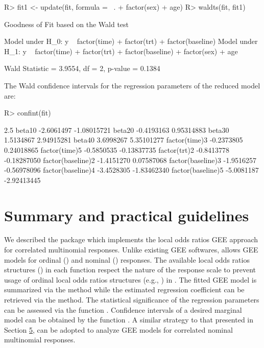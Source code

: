 \documentclass[
]{jss}
\begin{document}
\begin{CodeChunk}

\begin{CodeInput}
R> fit1 <- update(fit, formula = ~. + factor(sex) + age)
R> waldts(fit, fit1)
\end{CodeInput}

\begin{CodeOutput}
Goodness of Fit based on the Wald test 

Model under H_0: y ~ factor(time) + factor(trt) + factor(baseline)
Model under H_1: y ~ factor(time) + factor(trt) + factor(baseline) + factor(sex) + 
    age

Wald Statistic = 3.9554, df = 2, p-value = 0.1384
\end{CodeOutput}
\end{CodeChunk}

The Wald confidence intervals for the regression parameters of the
reduced model are:

\begin{CodeChunk}

\begin{CodeInput}
R> confint(fit)
\end{CodeInput}

\begin{CodeOutput}
                       2.5 %
beta10            -2.6061497 -1.08015721
beta20            -0.4193163  0.95314883
beta30             1.5134867  2.94915281
beta40             3.6998267  5.35101277
factor(time)3     -0.2373805  0.24018865
factor(time)5     -0.5850535 -0.13837735
factor(trt)2      -0.8413778 -0.18287050
factor(baseline)2 -1.4151270  0.07587068
factor(baseline)3 -1.9516257 -0.56978096
factor(baseline)4 -3.4528305 -1.83462340
factor(baseline)5 -5.0081187 -2.92413445
\end{CodeOutput}
\end{CodeChunk}

\hypertarget{Summary}{%
\section{Summary and practical guidelines}\label{Summary}}

We described the  package  which implements the
local odds ratios GEE approach \citep{Touloumis2012} for correlated
multinomial responses. Unlike existing GEE softwares, 
allows GEE models for ordinal () and nominal
() responses. The available local odds ratios structures
() in each function respect the nature of the response
scale to prevent usage of ordinal local odds ratios structures (e.g.,
) in . The fitted GEE model is
summarized via the  method while the estimated regression
coefficient can be retrieved via the  method. The statistical
significance of the regression parameters can be assessed via the
function . Confidence intervals of a desired marginal model
can be obtained by the function . A similar strategy to
that presented in Section \protect\hyperlink{Example}{5}, can be adopted
to analyze GEE models for correlated nominal multinomial responses.
\end{document}
